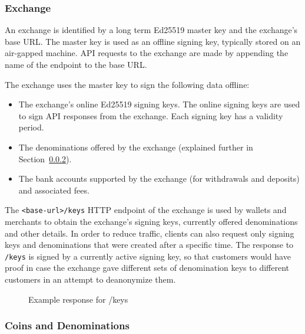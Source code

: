 \subsubsection{Exchange}
An exchange is identified by a long term Ed25519 master key and the exchange's
base URL.  The master key is used as an offline signing key, typically stored
on an air-gapped machine.  API requests to the exchange are made by appending
the name of the endpoint to the base URL.

The exchange uses the master key to sign the following data offline:
\begin{itemize}
  \item The exchange's online Ed25519 signing keys.  The online signing keys
    are used to sign API responses from the exchange.  Each signing key has a
    validity period.
  \item The denominations offered by the exchange (explained further in Section~\ref{sec:implementation:denoms}).
  \item The bank accounts supported by the exchange (for withdrawals and deposits) and associated fees.
\end{itemize}

The \texttt{<base-url>/keys} HTTP endpoint of the exchange is used by wallets
and merchants to obtain the exchange's signing keys, currently offered
denominations and other details.  In order to reduce traffic, clients can also
request only signing keys and denominations that were created after a specific
time.  The response to \texttt{/keys} is signed by a currently active signing
key, so that customers would have proof in case the exchange gave different sets of
denomination keys to different customers in an attempt to deanonymize them.


\begin{figure}
  \begin{multicols}{2}
  
  \end{multicols}
  \caption{Example response for /keys}
\end{figure}


\subsubsection{Coins and Denominations}\label{sec:implementation:denoms}

